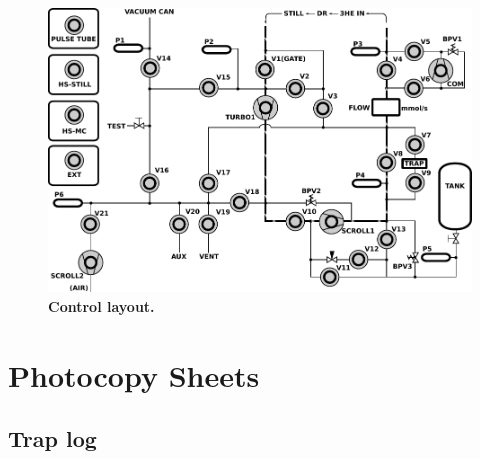 \documentclass{article}[18pt,A4]
\begin{document}
\begin{figure}[t]
\centering
\includegraphics{fig/blu_fors_ghs.pdf}
\caption{\textbf{Control layout.}
\label{fig:blu_fors_ghs}
}
\end{figure}

\clearpage

\section{Photocopy Sheets}

\subsection{Trap log}

\end{document}
